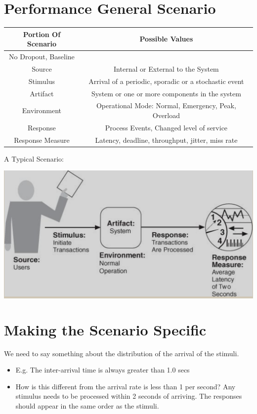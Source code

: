 \documentclass[a4paper]{report}
\begin{document}
\section{Performance General Scenario}
\begin{tabular}{||c | c||} 
 \hline
 Portion Of Scenario & Possible Values \\ [0.5ex] 
 \hline\hline
 No Dropout, Baseline &  \\ 
 \hline
 Source & Internal or External to the System \\
 \hline
 Stimulus & Arrival of a periodic, sporadic or a stochastic event \\
 \hline
 Artifact & System or one or more components in the system \\
 \hline
 Environment & Operational Mode: Normal, Emergency, Peak, Overload  \\
 \hline
 Response & Process Events, Changed level of service \\ 
 \hline
 Response Measure & Latency, deadline, throughput, jitter, miss rate \\
 \hline
\end{tabular}
\newline
\newline
A Typical Scenario:
\begin{center}
\includegraphics[scale=0.6]{sad.png}
\end{center}

\section{Making the Scenario Specific}
We need to say something about the distribution of the arrival of the stimuli.
\begin{itemize}
\item{E.g. The inter-arrival time is always greater than 1.0 secs}
\item{How is this different from the arrival rate is less than 1 per second?}
Any stimulus needs to be processed within 2 seconds of arriving.
The responses should appear in the same order as the stimuli.
\end{itemize}
\end{document}
